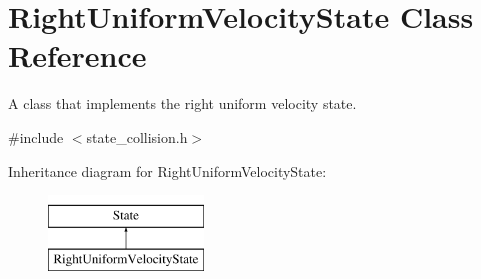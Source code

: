 \hypertarget{classRightUniformVelocityState}{\section{Right\-Uniform\-Velocity\-State Class Reference}
\label{classRightUniformVelocityState}
}


A class that implements the right uniform velocity state.  




{\ttfamily \#include $<$state\-\_\-collision.\-h$>$}

Inheritance diagram for Right\-Uniform\-Velocity\-State\-:\begin{figure}[H]
\begin{center}
\leavevmode
\includegraphics[height=2.000000cm]{classRightUniformVelocityState}
\end{center}
\end{figure}
